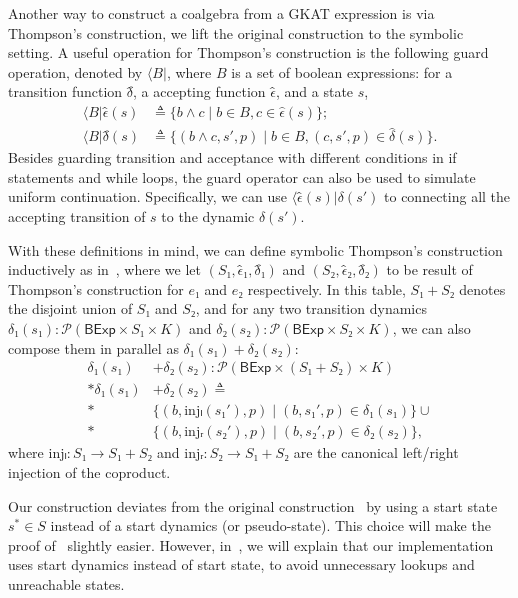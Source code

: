 \documentclass[conference]{IEEEtran}
\newcommand{\theoryOf}[1]{\ensuremath{\mathsf{#1}}}
\newcommand{\BExp}{\theoryOf{BExp}}
\begin{document}
Another way to construct a coalgebra from a GKAT expression is via Thompson's construction, we lift the original construction to the symbolic setting.
A useful operation for Thompson's construction is the following guard operation, denoted by \(⟨B|\), where \(B\) is a set of boolean expressions: for a transition function \(δ̂\), a accepting function \(ϵ̂\), and a state \(s\),
\begin{align*}
    ⟨B|ϵ̂(s) & ≜ \{b ∧ c ∣ b ∈ B, c ∈ \hat{\epsilon}(s)\}; \\
    ⟨B|δ̂(s) & ≜ \{(b ∧ c, s', p) ∣ b ∈ B, (c, s', p) ∈ \hat{\delta}(s)\}.
\end{align*}
Besides guarding transition and acceptance with different conditions in if statements and while loops, the guard operator can also be used to simulate uniform continuation. Specifically, we can use \(⟨ϵ̂(s)|δ(s')\) to connecting all the accepting transition of \(s\) to the dynamic \(δ(s')\).

With these definitions in mind, we can define symbolic Thompson's construction inductively as in~, where we let \((S₁, ϵ̂₁, δ̂₁)\) and \((S₂, ϵ̂₂, δ̂₂)\) to be result of Thompson's construction for \(e₁\) and \(e₂\) respectively.
In this table, \(S₁ + S₂\) denotes the disjoint union of \(S₁\) and \(S₂\), and for any two transition dynamics \(δ₁(s₁): \mathscr{P}(\BExp × S₁ × K)\) and \(δ₂(s₂): \mathscr{P}(\BExp × S₂ × K)\), we can also compose them in parallel as \(δ₁(s₁) + δ₂(s₂)\):
\begin{align*}
    δ₁(s₁) & + δ₂(s₂): \mathscr{P}(\BExp × (S₁ + S₂) × K) \\*
    δ₁(s₁) & + δ₂(s₂) ≜ \\*
        & \{(b, \mathrm{inj}ₗ(s₁'), p) ∣ (b, s₁', p) ∈ δ₁(s₁)\} ∪ \\*
        & \{(b, \mathrm{inj}ᵣ(s₂'), p) ∣ (b, s₂', p) ∈ δ₂(s₂)\},
\end{align*}
where \(\mathrm{inj}ₗ: S₁ → S₁ + S₂\) and \(\mathrm{inj}ᵣ: S₂ → S₁ + S₂\) are the canonical left/right injection of the coproduct.

Our construction deviates from the original construction~\cite{smolka_GuardedKleeneAlgebra_2020} by using a start state \(s^* ∈ S\) instead of a start dynamics (or pseudo-state).
This choice will make the proof of~ slightly easier. 
However, in~, we will explain that our implementation uses start dynamics instead of start state, to avoid unnecessary lookups and unreachable states.
\end{document}
